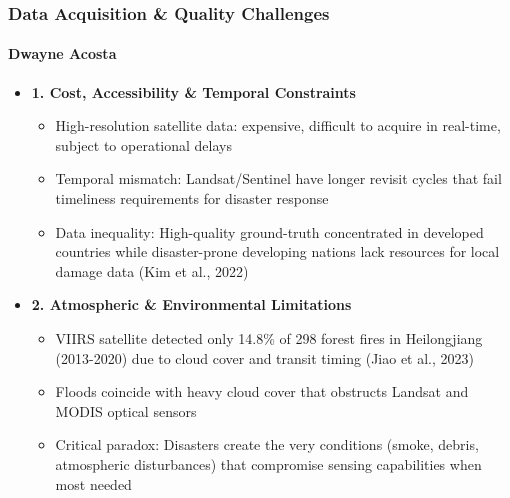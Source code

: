 \documentclass{beamer}
\newcommand{\namedframe}[3]{
  \begin{frame}
    \frametitle{#2}
    \framesubtitle{#1}
    #3
  \end{frame}
}
\begin{document}
\namedframe{Dwayne Acosta}{Data Acquisition \& Quality Challenges}{
\begin{itemize}
    \item \textbf{1. Cost, Accessibility \& Temporal Constraints}
    \begin{itemize}
        \item High-resolution satellite data: expensive, difficult to acquire in real-time, subject to operational delays
        \item Temporal mismatch: Landsat/Sentinel have longer revisit cycles that fail timeliness requirements for disaster response
        \item Data inequality: High-quality ground-truth concentrated in developed countries while disaster-prone developing nations lack resources for local damage data (Kim et al., 2022)
    \end{itemize}
    
    \item \textbf{2. Atmospheric \& Environmental Limitations}
    \begin{itemize}
        \item VIIRS satellite detected only 14.8\% of 298 forest fires in Heilongjiang (2013-2020) due to cloud cover and transit timing (Jiao et al., 2023)
        \item Floods coincide with heavy cloud cover that obstructs Landsat and MODIS optical sensors
        \item Critical paradox: Disasters create the very conditions (smoke, debris, atmospheric disturbances) that compromise sensing capabilities when most needed
    \end{itemize}
\end{itemize}
}
\end{document}
